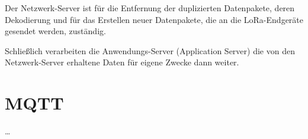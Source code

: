 Der Netzwerk-Server ist für die Entfernung der duplizierten Datenpakete, deren Dekodierung und für das Erstellen neuer Datenpakete, die an die LoRa-Endgeräte gesendet werden, zuständig. 

Schließlich verarbeiten die Anwendungs-Server (Application Server) die von den Netzwerk-Server erhaltene Daten für eigene Zwecke dann weiter. 


\section{MQTT} \label{MQTT}

\ldots


